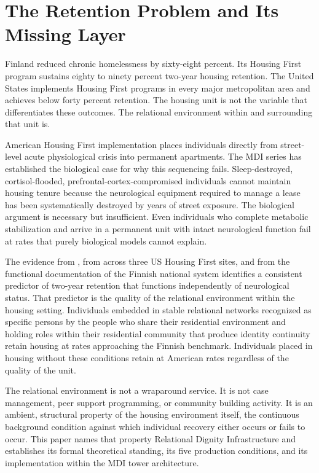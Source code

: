 \documentclass[12pt, letterpaper]{article}
\begin{document}
\newpage
\begingroup
{}
\setlength{\cftbeforesecskip}{2pt}
\setlength{\cftbeforesubsecskip}{-2pt}
\tableofcontents
\endgroup

\newpage
{}

\clearpage
\section{The Retention Problem and Its Missing Layer}

Finland reduced chronic homelessness by sixty-eight percent. Its Housing First program sustains eighty to ninety percent two-year housing retention. The United States implements Housing First programs in every major metropolitan area and achieves below forty percent retention. The housing unit is not the variable that differentiates these outcomes. The relational environment within and surrounding that unit is.

American Housing First implementation places individuals directly from street-level acute physiological crisis into permanent apartments. The MDI series has established the biological case for why this sequencing fails. Sleep-destroyed, cortisol-flooded, prefrontal-cortex-compromised individuals cannot maintain housing tenure because the neurological equipment required to manage a lease has been systematically destroyed by years of street exposure. The biological argument is necessary but insufficient. Even individuals who complete metabolic stabilization and arrive in a permanent unit with intact neurological function fail at rates that purely biological models cannot explain.

The evidence from \citet{padgett_2007}, from \citet{tsai_2012} across three US Housing First sites, and from the \citet{yfoundation_2022} functional documentation of the Finnish national system identifies a consistent predictor of two-year retention that functions independently of neurological status. That predictor is the quality of the relational environment within the housing setting. Individuals embedded in stable relational networks recognized as specific persons by the people who share their residential environment and holding roles within their residential community that produce identity continuity retain housing at rates approaching the Finnish benchmark. Individuals placed in housing without these conditions retain at American rates regardless of the quality of the unit.

The relational environment is not a wraparound service. It is not case management, peer support programming, or community building activity. It is an ambient, structural property of the housing environment itself, the continuous background condition against which individual recovery either occurs or fails to occur. This paper names that property Relational Dignity Infrastructure and establishes its formal theoretical standing, its five production conditions, and its implementation within the MDI tower architecture.
\end{document}
